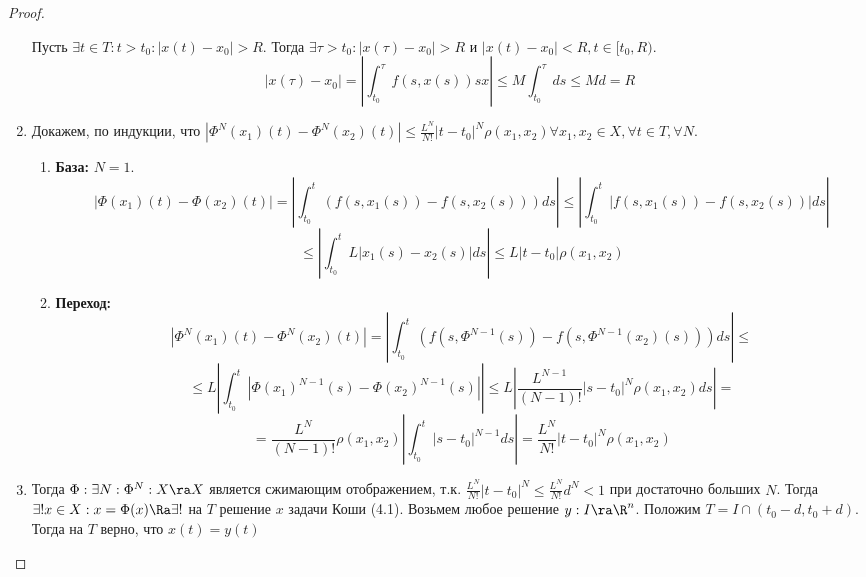 \begin{proof}
\begin{enumerate}
        Пусть \(\exists t \in T: t > t_0: |x(t) - x_0| > R\). Тогда \(\exists \tau > t_0: |x(\tau) - x_0| > R\) и \(|x(t) - x_0| < R, t \in [t_0, R)\).
        \[|x(\tau) - x_0| = \left| \int_{t_0}^\tau f(s, x(s))sx \right| \le M\int_{t_0}^\tau ds \le Md = R\]
        \item Докажем, по индукции, что \(|\Phi^N(x_1)(t) - \Phi^N(x_2)(t)| \le \frac{L^N}{N!}|t - t_0|^N \rho(x_1, x_2) \forall x_1, x_2 \in X, \forall t \in T, \forall N\).
        \begin{enumerate}
            \item[] \textbf{База:} \(N = 1\).
            \[|\Phi(x_1)(t) - \Phi(x_2)(t)| = \left| \int_{t_0}^t \left( f(s, x_1(s)) - f(s, x_2(s)) \right)ds \right| \le \left| \int_{t_0}^t \left| f(s, x_1(s)) - f(s, x_2(s)) \right|ds \right|\]
            \[\le \left| \int_{t_0}^t L|x_1(s) - x_2(s)|ds \right| \le L|t - t_0|\rho(x_1, x_2)\]
            \item[] \textbf{Переход:}
            \[|\Phi^N(x_1)(t) - \Phi^N(x_2)(t)| = \left| \int_{t_0}^t \left( f(s, \Phi^{N - 1}(s)) - f(s, \Phi^{N - 1}(x_2)(s)) \right)ds \right| \le \]
            \[\le L\left| \int_{t_0}^t |\Phi(x_1)^{N - 1}(s) - \Phi(x_2)^{N - 1}(s)| \right| \le L\left| \frac{L^{N - 1}}{(N - 1)!}|s - t_0|^N\rho(x_1, x_2)ds \right| = \]
            \[= \frac{L^N}{(N - 1)!}\rho(x_1, x_2)\left| \int_{t_0}^t |s - t_0|^{N - 1}ds \right| = \frac{L^N}{N!}|t - t_0|^N\rho(x_1, x_2)\]
        \end{enumerate}

        \item Тогда \(\Phi: \exists N: \Phi^N: X \ra X\) является сжимающим отображением, т.к. \(\frac{L^N}{N!}|t - t_0|^N \le \frac{L^N}{N!}d^N < 1\) при достаточно больших \(N\). Тогда \(\exists! x \in X: x = \Phi(x) \Ra \exists!\) на \(T\) решение \(x\) задачи Коши (4.1). Возьмем любое решение \(y: I \ra \R^n\). Положим \(T = I \cap (t_0 - d, t_0 + d)\). Тогда на \(T\) верно, что \(x(t) = y(t)\)
    \end{enumerate}
\end{proof}

